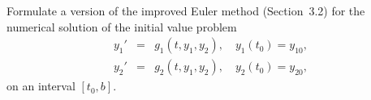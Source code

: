 \begin{exerciselist}
  \item\label{exer:10.1.8} Formulate a version of the improved Euler method (Section~3.2) for the
        numerical solution of the initial value problem
  \[
    \begin{array}{rcl}
      y_{1}' & = & g_{1}(t,y_{1},y_{2}),\quad y_{1}(t_{0})=y_{10}, \\
      y_{2}' & = & g_{2}(t,y_{1},y_{2}),\quad y_{2}(t_{0})=y_{20},
    \end{array}
  \]
  on an interval $[t_{0},b]$.
\end{exerciselist}
